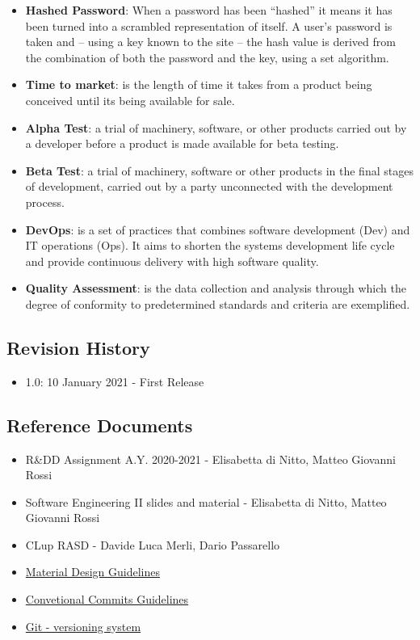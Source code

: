 \begin{itemize}
    \item \textbf{Hashed Password}: When a password has been “hashed” it means it has been turned into a scrambled representation of itself. A user's password is taken and – using a key known to the site – the hash value is derived from the combination of both the password and the key, using a set algorithm.
    \item \textbf{Time to market}: is the length of time it takes from a product being conceived until its being available for sale.
    \item \textbf{Alpha Test}: a trial of machinery, software, or other products carried out by a developer before a product is made available for beta testing.
    \item \textbf{Beta Test}: a trial of machinery, software or other products in the final stages of development, carried out by a party unconnected with the development process.
    \item \textbf{DevOps}: is a set of practices that combines software development (Dev) and IT operations (Ops). It aims to shorten the systems development life cycle and provide continuous delivery with high software quality.
    \item \textbf{Quality Assessment}: is the data collection and analysis through which the degree of conformity to predetermined standards and criteria are exemplified.
\end{itemize}

\subsection{Revision History}

\begin{itemize}
    \item 1.0: 10 January 2021 - First Release
\end{itemize}

\subsection{Reference Documents}

\begin{itemize}
    \item R\&DD Assignment A.Y. 2020-2021 - Elisabetta di Nitto, Matteo Giovanni Rossi
    \item Software Engineering II slides and material - Elisabetta di Nitto, Matteo Giovanni Rossi
    \item CLup RASD - Davide Luca Merli, Dario Passarello
    \item \href{https://material.io/design}{Material Design Guidelines}
    \item \href{https://www.conventionalcommits.org/en/v1.0.0/}{Convetional Commits Guidelines}
    \item \href{https://git-scm.com/}{Git - versioning system}
\end{itemize}

